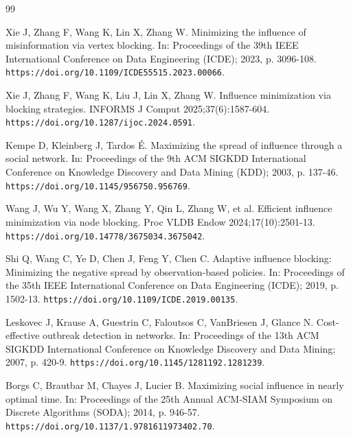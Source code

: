 \documentclass[preprint,11pt]{elsarticle}
\theoremstyle{definition}
\theoremstyle{remark}
\begin{document}
\begin{thebibliography}{99}
\providecommand{\natexlab}[1]{#1}
\providecommand{\url}[1]{\texttt{#1}}

Xie J, Zhang F, Wang K, Lin X, Zhang W. Minimizing the influence of misinformation via vertex blocking. In: Proceedings of the 39th IEEE International Conference on Data Engineering (ICDE); 2023, p. 3096-108. \url{https://doi.org/10.1109/ICDE55515.2023.00066}.

Xie J, Zhang F, Wang K, Liu J, Lin X, Zhang W. Influence minimization via blocking strategies. INFORMS J Comput 2025;37(6):1587-604. \url{https://doi.org/10.1287/ijoc.2024.0591}.

Kempe D, Kleinberg J, Tardos É. Maximizing the spread of influence through a social network. In: Proceedings of the 9th ACM SIGKDD International Conference on Knowledge Discovery and Data Mining (KDD); 2003, p. 137-46. \url{https://doi.org/10.1145/956750.956769}.

Wang J, Wu Y, Wang X, Zhang Y, Qin L, Zhang W, et al. Efficient influence minimization via node blocking. Proc VLDB Endow 2024;17(10):2501-13. \url{https://doi.org/10.14778/3675034.3675042}.

Shi Q, Wang C, Ye D, Chen J, Feng Y, Chen C. Adaptive influence blocking: Minimizing the negative spread by observation-based policies. In: Proceedings of the 35th IEEE International Conference on Data Engineering (ICDE); 2019, p. 1502-13. \url{https://doi.org/10.1109/ICDE.2019.00135}.

Leskovec J, Krause A, Guestrin C, Faloutsos C, VanBriesen J, Glance N. Cost-effective outbreak detection in networks. In: Proceedings of the 13th ACM SIGKDD International Conference on Knowledge Discovery and Data Mining; 2007, p. 420-9. \url{https://doi.org/10.1145/1281192.1281239}.

Borgs C, Brautbar M, Chayes J, Lucier B. Maximizing social influence in nearly optimal time. In: Proceedings of the 25th Annual ACM-SIAM Symposium on Discrete Algorithms (SODA); 2014, p. 946-57. \url{https://doi.org/10.1137/1.9781611973402.70}.


\end{thebibliography}
\end{document}
